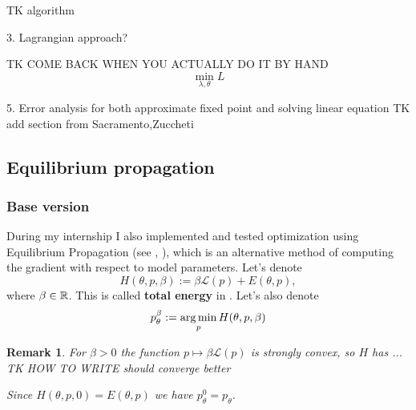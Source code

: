 \documentclass[a4paper,10pt]{report}
\newtheorem{remark}{Remark}
\begin{document}
TK algorithm




3. Lagrangian approach?

TK COME BACK WHEN YOU ACTUALLY DO IT BY HAND
 \begin{equation}
\min_{\lambda,\theta} L
 \end{equation}

5. Error analysis for both approximate fixed point and solving linear equation
TK add section from Sacramento,Zuccheti
\subsection{ Equilibrium propagation}

\subsubsection{Base version}
During my internship I also implemented and tested optimization using Equilibrium Propagation (see \cite{eqprop}, \cite{zucchet2022beyond}), which is an alternative method of computing the gradient with respect to model parameters.
Let's denote
\begin{equation}
H(\theta, p, \beta) := \beta \mathcal{L}(p) + E(\theta, p),
\end{equation}
where $\beta \in \mathbb{R}$.
 This is called \textbf{total energy} in \cite{eqprop}. Let's also denote
\begin{equation}
p_{\theta}^{\beta}:=\operatorname*{arg\,min}_p H(\theta, p, \beta)
\end{equation}
\begin{remark}
 For $\beta>0$ the function $p \mapsto \beta \mathcal{L}(p)$ is strongly convex, so $H$ has ... TK HOW TO WRITE should converge better

 Since $H(\theta,p,0) = E(\theta,p)$ we have $p_{\theta}^{0}=p_{\theta}$.
 \end{remark}
\end{document}
